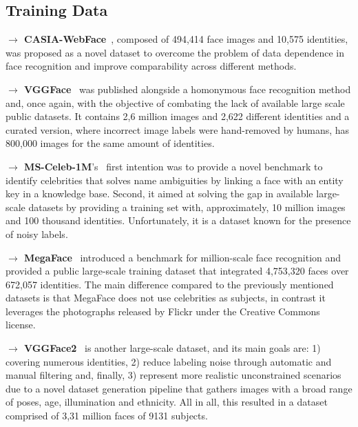 \documentclass[class=report, crop=false, a4paper, 12pt]{standalone}
\begin{document}
\begin{appendix}


\chapter{Training Data}\label{appendix:train_data_appendix}
\noindent\textbf{$\rightarrow$ CASIA-WebFace}~\autocite{yiLearningFaceRepresentation2014}, composed of 494,414 face images and 10,575 identities, was proposed as a novel dataset to overcome the problem of data dependence in face recognition and improve comparability across different methods.

\vspace{0.7\baselineskip}
\noindent\textbf{$\rightarrow$ VGGFace}~\autocite{parkhiDeepFaceRecognition2015} was published alongside a homonymous face recognition method and, once again, with the objective of combating the lack of available large scale public datasets. It contains 2,6 million images and 2,622 different identities and a curated version, where incorrect image labels were hand-removed by humans, has 800,000 images for the same amount of identities.

\vspace{0.7\baselineskip}
\noindent\textbf{$\rightarrow$ MS-Celeb-1M}'s~\autocite{guoMSCeleb1MDatasetBenchmark2016} first intention was to provide a novel benchmark to identify celebrities that solves name ambiguities by linking a face with an entity key in a knowledge base. Second, it aimed at solving the gap in available large-scale datasets by providing a training set with, approximately, 10 million images and 100 thousand identities. Unfortunately, it is a dataset known for the presence of noisy labels. 

\vspace{0.7\baselineskip}
\noindent\textbf{$\rightarrow$ MegaFace}~\autocite{nechLevelPlayingField2017} introduced a benchmark for million-scale face recognition and provided a public large-scale training dataset that integrated 4,753,320 faces over 672,057 identities. The main difference compared to the previously mentioned datasets is that MegaFace does not use celebrities as subjects, in contrast it leverages the photographs released by Flickr under the Creative Commons license. 

\vspace{0.7\baselineskip}
\noindent\textbf{$\rightarrow$ VGGFace2}~\autocite{caoVGGFace2DatasetRecognising2018} is another large-scale dataset, and its main goals are: 1) covering numerous identities, 2) reduce labeling noise through automatic and manual filtering and, finally, 3) represent more realistic unconstrained scenarios due to a novel dataset generation pipeline that gathers images with a broad range of poses, age, illumination and ethnicity. All in all, this resulted in a dataset comprised of 3,31 million faces of 9131 subjects.


\end{appendix}
\end{document}
